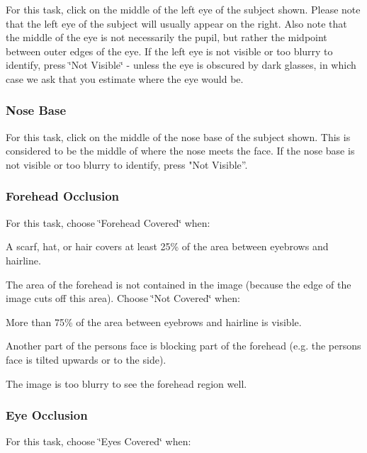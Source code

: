 For this task, click on the middle of the left eye of the subject shown. Please note that the left eye of the subject will usually appear on the right. Also note that the middle of the eye is not necessarily the pupil, but rather the midpoint between outer edges of the eye. If the left eye is not visible or too blurry to identify, press \char`\"{}\+Not Visible\char`\"{} -\/ unless the eye is obscured by dark glasses, in which case we ask that you estimate where the eye would be.\hypertarget{group__janus_nose_base}{}\subsubsection{Nose Base}\label{group__janus_nose_base}
For this task, click on the middle of the nose base of the subject shown. This is considered to be the middle of where the nose meets the face. If the nose base is not visible or too blurry to identify, press "Not Visible”.\hypertarget{group__janus_forehead_visible}{}\subsubsection{Forehead Occlusion}\label{group__janus_forehead_visible}
For this task, choose \char`\"{}\+Forehead Covered\char`\"{} when\+:
\begin{DoxyItemize}
\item A scarf, hat, or hair covers at least 25\% of the area between eyebrows and hairline.
\item The area of the forehead is not contained in the image (because the edge of the image cuts off this area). Choose \char`\"{}\+Not Covered\char`\"{} when\+:
\item More than 75\% of the area between eyebrows and hairline is visible.
\item Another part of the person\textquotesingle{}s face is blocking part of the forehead (e.\+g. the person\textquotesingle{}s face is tilted upwards or to the side).
\item The image is too blurry to see the forehead region well.
\end{DoxyItemize}\hypertarget{group__janus_eyes_visible}{}\subsubsection{Eye Occlusion}\label{group__janus_eyes_visible}
For this task, choose \char`\"{}\+Eyes Covered\char`\"{} when\+:
